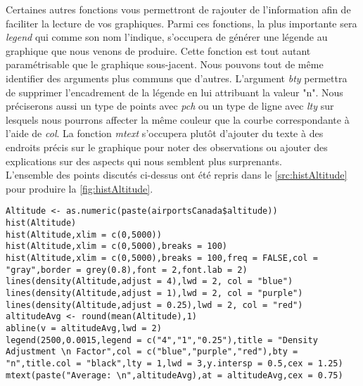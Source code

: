 \noindent
Certaines autres fonctions vous permettront de rajouter de l'information afin de faciliter la lecture de vos graphiques. Parmi ces fonctions, la plus importante sera \emph{legend} qui comme son nom l'indique, s'occupera de générer une légende au graphique que nous venons de produire. Cette fonction est tout autant paramétrisable que le graphique sous-jacent. Nous pouvons tout de même identifier des arguments plus communs que d'autres. L'argument \emph{bty} permettra de supprimer l'encadrement de la légende en lui attribuant la valeur "n". Nous préciserons aussi un type de points avec \emph{pch} ou un type de ligne avec \emph{lty} sur lesquels nous pourrons affecter la même couleur que la courbe correspondante à l'aide de \emph{col}. La fonction \emph{mtext} s'occupera plutôt d'ajouter du texte à des endroits précis sur le graphique pour noter des observations ou ajouter des explications sur des aspects qui nous semblent plus surprenants. \\

\noindent
L'ensemble des points discutés ci-dessus ont été repris dans le \autoref{src:histAltitude} pour produire la \autoref{fig:histAltitude}. \\

\begin{lstlisting}[caption = {\emph{hist}, \emph{density}, \emph{lines}, \emph{abline}, \emph{legend} et \emph{mtext}},label=src:histAltitude]
Altitude <- as.numeric(paste(airportsCanada$altitude))
hist(Altitude)
hist(Altitude,xlim = c(0,5000))
hist(Altitude,xlim = c(0,5000),breaks = 100)
hist(Altitude,xlim = c(0,5000),breaks = 100,freq = FALSE,col = "gray",border = grey(0.8),font = 2,font.lab = 2)
lines(density(Altitude,adjust = 4),lwd = 2, col = "blue")
lines(density(Altitude,adjust = 1),lwd = 2, col = "purple")
lines(density(Altitude,adjust = 0.25),lwd = 2, col = "red")
altitudeAvg <- round(mean(Altitude),1)
abline(v = altitudeAvg,lwd = 2)
legend(2500,0.0015,legend = c("4","1","0.25"),title = "Density Adjustment \n Factor",col = c("blue","purple","red"),bty = "n",title.col = "black",lty = 1,lwd = 3,y.intersp = 0.5,cex = 1.25)
mtext(paste("Average: \n",altitudeAvg),at = altitudeAvg,cex = 0.75)
\end{lstlisting}


